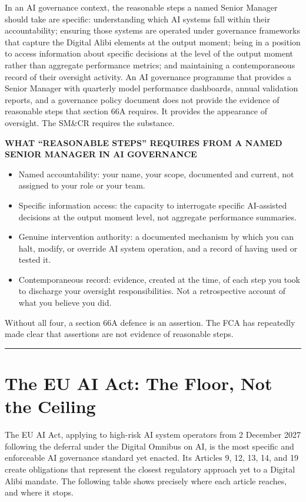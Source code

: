 In an AI governance context, the reasonable steps a named Senior Manager should take are specific: understanding which AI systems fall within their accountability; ensuring those systems are operated under governance frameworks that capture the Digital Alibi elements at the output moment; being in a position to access information about specific decisions at the level of the output moment rather than aggregate performance metrics; and maintaining a contemporaneous record of their oversight activity. An AI governance programme that provides a Senior Manager with quarterly model performance dashboards, annual validation reports, and a governance policy document does not provide the evidence of reasonable steps that section 66A requires. It provides the appearance of oversight. The SM\&CR requires the substance.

\textbf{WHAT ``REASONABLE STEPS'' REQUIRES FROM A NAMED SENIOR MANAGER IN AI GOVERNANCE}

\begin{itemize}
\tightlist
\item
  Named accountability: your name, your scope, documented and current, not assigned to your role or your team.
\item
  Specific information access: the capacity to interrogate specific AI-assisted decisions at the output moment level, not aggregate performance summaries.
\item
  Genuine intervention authority: a documented mechanism by which you can halt, modify, or override AI system operation, and a record of having used or tested it.
\item
  Contemporaneous record: evidence, created at the time, of each step you took to discharge your oversight responsibilities. Not a retrospective account of what you believe you did.
\end{itemize}

Without all four, a section 66A defence is an assertion. The FCA has repeatedly made clear that assertions are not evidence of reasonable steps.

\begin{center}\rule{0.5\linewidth}{0.5pt}\end{center}

\section{The EU AI Act: The Floor, Not the Ceiling}

The EU AI Act, applying to high-risk AI system operators from 2 December 2027 following the deferral under the Digital Omnibus on AI, is the most specific and enforceable AI governance standard yet enacted. Its Articles 9, 12, 13, 14, and 19 create obligations that represent the closest regulatory approach yet to a Digital Alibi mandate. The following table shows precisely where each article reaches, and where it stops.

